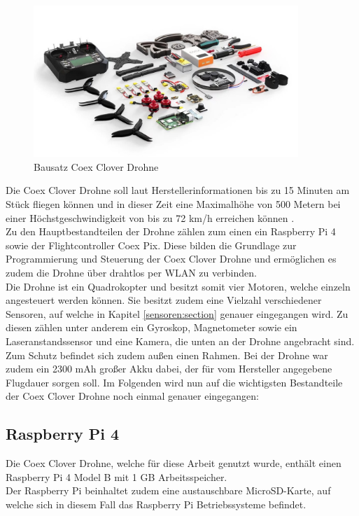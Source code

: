 \begin{figure}[htpb]
    \centering
    \includegraphics[width=10cm,keepaspectratio,angle=0]{images/coex_clover_kit.jpg}
    \caption[Bausatz Coex Clover Drohne]{\label{img coex_clover_kit} Bausatz Coex Clover Drohne \cite{imgcoexcloverkit}}
\end{figure}

Die Coex Clover Drohne soll laut Herstellerinformationen bis zu 15 Minuten am Stück fliegen können und in dieser Zeit eine Maximalhöhe von 500 Metern bei einer Höchstgeschwindigkeit von bis zu 72 km/h erreichen können \cite[vgl.][]{coex_clover}.\\

Zu den Hauptbestandteilen der Drohne zählen zum einen ein Raspberry Pi 4 sowie der Flightcontroller Coex Pix. Diese bilden die Grundlage zur Programmierung und Steuerung der Coex Clover Drohne und ermöglichen es zudem die Drohne über drahtlos per WLAN zu verbinden. \\
Die Drohne ist ein Quadrokopter und besitzt somit vier Motoren, welche einzeln angesteuert werden können. Sie besitzt zudem eine Vielzahl verschiedener Sensoren, auf welche in Kapitel \ref{sensoren:section} genauer eingegangen wird. Zu diesen zählen unter anderem ein Gyroskop, Magnetometer sowie ein Laseranstandssensor und eine Kamera, die unten an der Drohne angebracht sind.
Zum Schutz befindet sich zudem außen einen Rahmen.
Bei der Drohne war zudem ein 2300 mAh großer Akku dabei, der für vom Hersteller angegebene Flugdauer sorgen soll.
Im Folgenden wird nun auf die wichtigsten Bestandteile der Coex Clover Drohne noch einmal genauer eingegangen:

\subsection{Raspberry Pi 4} \label{raspberry_pi:subsection}

Die Coex Clover Drohne, welche für diese Arbeit genutzt wurde, enthält einen Raspberry Pi 4 Model B mit 1 GB Arbeitsspeicher.\\
Der Raspberry Pi beinhaltet zudem eine austauschbare MicroSD-Karte, auf welche sich in diesem Fall das Raspberry Pi Betriebssysteme befindet. \\

